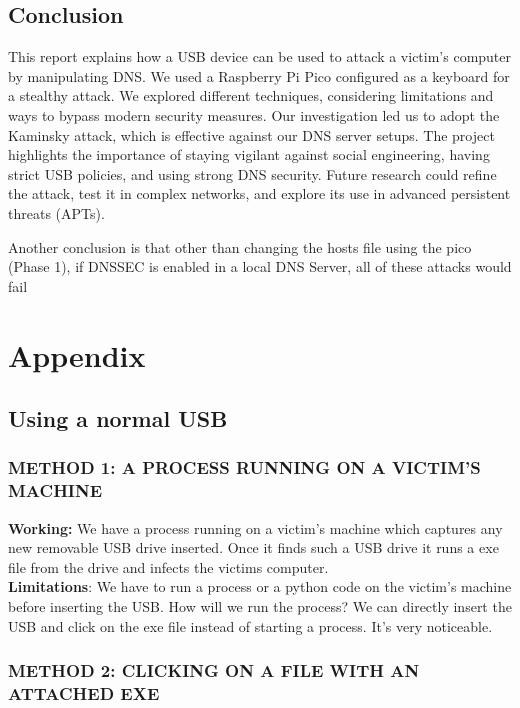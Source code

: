 \documentclass[11pt]{report}
\begin{document}
\section*{Conclusion}

This report explains how a USB device can be used to attack a victim's computer
by manipulating DNS. We used a Raspberry Pi Pico configured as a keyboard for a
stealthy attack. We explored different techniques, considering limitations and
ways to bypass modern security measures. Our investigation led us to adopt the
Kaminsky attack, which is effective against our DNS server setups. The project
highlights the importance of staying vigilant against social engineering,
having strict USB policies, and using strong DNS security. Future research
could refine the attack, test it in complex networks, and explore its use in
advanced persistent threats (APTs).

Another conclusion is that other than changing the hosts file using the pico (Phase 1), if DNSSEC is enabled in a local DNS Server, all of these attacks would fail



\newpage \appendix 
\chapter*{Appendix}
\section*{Using a normal USB}
\subsection*{METHOD 1: A PROCESS RUNNING ON A VICTIM'S MACHINE}

\textbf{Working:} We have a process running on a victim's machine which captures any new
removable USB drive inserted. Once it finds such a USB drive it runs a exe file
from the drive and infects the victims computer. \\[0.5em]
\textbf{Limitations}: We have to run a process or a python code on the victim's
machine before inserting the USB. How will we run the process? We can directly
insert the USB and click on the exe file instead of starting a process. It's
very noticeable.

\subsection*{METHOD 2: CLICKING ON A FILE WITH AN ATTACHED EXE}
\end{document}
